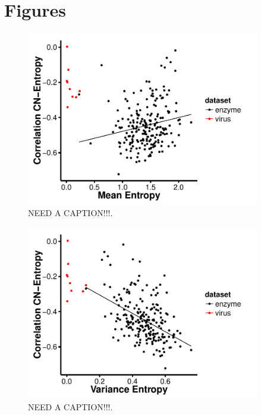 \documentclass[12pt]{article}
\begin{document}



\cleardoublepage
\section*{Figures}

    \begin{figure}[H]
            \centerline{\includegraphics[width=4in]{mean_entropy_cn_cor.pdf}}     
            \caption{NEED A CAPTION!!!.}
            \label{fig:seqent_structure_cors}
    \end{figure}

    \begin{figure}[H]
            \centerline{\includegraphics[width=4in]{var_entropy_cn_cor.pdf}}
            \caption{NEED A CAPTION!!!.}
            \label{fig:seqent_structure_cors}
    \end{figure}
\end{document}

